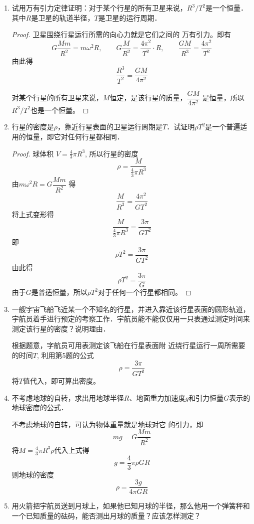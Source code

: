 \begin{enumerate}
	\item 试用万有引力定律证明：对于某个行星的所有卫星来说，$R^3/T^2$是一个恒量．其中$R$是卫星的轨道半径，$T$是卫星的运行周期．

	\begin{proof}
	卫星围绕行星运行所需的向心力就是它们之间的
万有引力。即有
\[G\frac{Mm}{R^2}=m\omega^2 R,\qquad G\frac{M}{R^2}=\frac{4\pi^2}{T^2}\cdot R,\qquad \frac{GM}{R^3}=\frac{4\pi^2}{T^2}\]
由此得
\[\frac{R^3}{T^2}=\frac{GM}{4\pi^2}\]

对某个行星的所有卫星来说，$M$恒定，是该行星的质量，$\dfrac{GM}{4\pi^2}$
是恒量，所以$R^3/T^2$也是一个恒量。
	\end{proof}
	
	\item 行星的密度是$\rho$，靠近行星表面的卫星运行周期是$T$．试证明$\rho T^2$是一个普遍适用的恒量，即它对任何行星都相同．

	\begin{proof}
球体积
$V=\frac{4}{3}\pi R^3$, 所以行星的密度
\[\rho=\frac{M}{\frac{4}{3}\pi R^3}\]
由$m\omega^2 R=G\dfrac{Mm}{R^2}$
得
\[\frac{M}{R^3}=\frac{4\pi^2}{GT^2}\]
将上式变形得
\[\frac{M}{\frac{4}{3}\pi R^3}=\frac{3\pi}{GT^2}\]
即
\[\rho T^2=\frac{3\pi}{GT^2}\]
由此得
\[\rho T^2=\frac{3\pi}{G}\]
由于$G$是普适恒量，所以$\rho T^2$对于任何一个行星都相同。
	\end{proof}
	
	\item 一艘宇宙飞船飞近某一个不知名的行星，并进入靠近该行星表面的圆形轨道，宇航员着手进行预定的考察工作．宇航员能不能仅仅用一只表通过测定时间来测定该行星的密度？说明理由．

	\begin{solution}
		根据题意，字航员可用表测定该飞船在行星表面附
		近绕行星运行一周所需要的时间$T$, 利用第5题的公式
		\[\rho=\frac{3\pi}{GT^2}\]
		将$T$值代入，即可算出密度。
	\end{solution}
	
	\item 不考虑地球的自转，求出用地球半径$R$、地面重力加速度$g$和引力恒量$G$表示的地球密度的公式．

	\begin{solution}
不考虑地球的自转，可认为物体重量就是地球对它
的引力，即
\[mg=G\frac{Mm}{R^2}\]
将$M=\frac{4}{3}\pi R^3\rho$代入上式得
\[g=\frac{4}{3}\pi\rho GR\]
则地球的密度
\[\rho=\frac{3g}{4\pi GR}\]
	\end{solution}
	
	\item 用火箭把宇航员送到月球上，如果他已知月球的半径，那么他用一个弹簧秤和一个已知质量的砝码，能否测出月球的质量？应该怎样测定？	


\end{enumerate}
